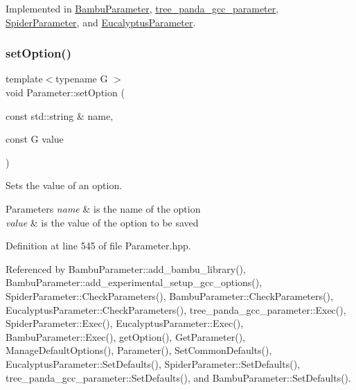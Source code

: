 Implemented in \hyperlink{classBambuParameter_a248447b97f9e6302fc1a356d1a34333e}{Bambu\+Parameter}, \hyperlink{classtree__panda__gcc__parameter_a2064bc94ae2751a0e420a60e2024fcbc}{tree\+\_\+panda\+\_\+gcc\+\_\+parameter}, \hyperlink{classSpiderParameter_afbc320968099098b78d33aa2b36667c1}{Spider\+Parameter}, and \hyperlink{classEucalyptusParameter_a6a12b064281764f529619b34b732a68d}{Eucalyptus\+Parameter}.

\mbox{\label{classParameter_ad5762d08597d6c2fe175efe23d66b148}} 
\subsubsection{\texorpdfstring{set\+Option()}{setOption()}\hspace{0.1cm}{\footnotesize\ttfamily [1/3]}}
{\footnotesize\ttfamily template$<$typename G $>$ \\
void Parameter\+::set\+Option (\begin{DoxyParamCaption}\item[{const std\+::string \&}]{name,  }\item[{const G}]{value }\end{DoxyParamCaption})\hspace{0.3cm}{\ttfamily [inline]}}



Sets the value of an option. 


\begin{DoxyParams}{Parameters}
{\em name} & is the name of the option \\
\hline
{\em value} & is the value of the option to be saved \\
\hline
\end{DoxyParams}


Definition at line 545 of file Parameter.\+hpp.



Referenced by Bambu\+Parameter\+::add\+\_\+bambu\+\_\+library(), Bambu\+Parameter\+::add\+\_\+experimental\+\_\+setup\+\_\+gcc\+\_\+options(), Spider\+Parameter\+::\+Check\+Parameters(), Bambu\+Parameter\+::\+Check\+Parameters(), Eucalyptus\+Parameter\+::\+Check\+Parameters(), tree\+\_\+panda\+\_\+gcc\+\_\+parameter\+::\+Exec(), Spider\+Parameter\+::\+Exec(), Eucalyptus\+Parameter\+::\+Exec(), Bambu\+Parameter\+::\+Exec(), get\+Option(), Get\+Parameter(), Manage\+Default\+Options(), Parameter(), Set\+Common\+Defaults(), Eucalyptus\+Parameter\+::\+Set\+Defaults(), Spider\+Parameter\+::\+Set\+Defaults(), tree\+\_\+panda\+\_\+gcc\+\_\+parameter\+::\+Set\+Defaults(), and Bambu\+Parameter\+::\+Set\+Defaults().

